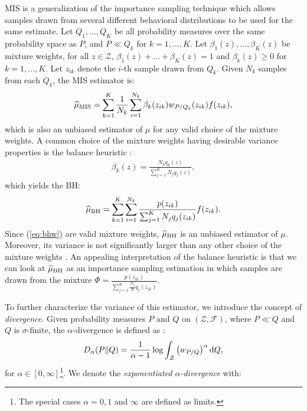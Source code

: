 \gls{MIS} \cite{veach_optimally_1995} is a generalization of the importance sampling technique which allows samples drawn from several different behavioral distributions to be used for the same estimate.
Let $Q_1,\dots,Q_K$ be all probability measures over the same probability space as $P$, and $P\ll Q_k$ for $k=1,\dots,K$. Let $\beta_1(z),\dots,\beta_K(z)$ be mixture weights, \ie for all $z\in\mathcal{Z}$, ${\beta_1(z)+\dots+\beta_K(z) = 1}$ and $\beta_k(z)\geq0$ for ${k=1,\dots,K}$. Let $z_{ik}$ denote the $i$-th sample drawn from $Q_k$. Given $N_k$ \iid samples from each $Q_k$, the \gls{MIS} estimator is:
\begin{align}\label{eq:mise}
	\widehat{\mu}_{\text{MIS}} = \sum_{k=1}^K\frac{1}{N_k}\sum_{i=1}^{N_k}\beta_k(z_{ik})w_{P/Q_k}(z_{ik})f(z_{ik}),
\end{align}
which is also an unbiased estimator of $\mu$ for any valid choice of the mixture weights. A common choice of the mixture weights having desirable variance properties is the balance heuristic \cite{veach_optimally_1995}: 
\begin{align}\label{eq:bhw}
	\beta_k(z) = \frac{N_kq_k(z)}{\sum_{j=1}^{K}N_jq_j(z)},
\end{align}
which yields the \gls{BH}:
\begin{align}\label{eq:bhe}
	\widehat{\mu}_{\text{BH}} = \sum_{k=1}^K\sum_{i=1}^{N_k}\frac{p(z_{ik})}{\sum_{j=1}^K N_jq_j(z_{ik})}f(z_{ik}).
\end{align}
Since (\ref{eq:bhw}) are valid mixture weights, $\widehat{\mu}_{\text{BH}}$ is an unbiased estimator of $\mu$. Moreover, its variance is not significantly larger than any other choice of the mixture weights \cite{veach_optimally_1995}. An appealing interpretation of the balance heuristic is that we can look at $\widehat{\mu}_{\text{BH}}$ as an importance sampling estimation in which samples are drawn from the mixture $\Phi = \frac{p(z_{ik})}{\sum_{j=1}^K \frac{N_j}{N}q_j(z_{ik})}$.

To further characterize the variance of this estimator, we introduce the concept of \emph{\Renyi divergence}. Given probability measures $P$ and $Q$ on $(\mathcal{Z},\mathcal{F})$, where $P\ll Q$ and $Q$ is $\sigma$-finite, the $\alpha$-\Renyi divergence is defined as \cite{renyi1961measures}:
\begin{align}\label{eq:renyi}
	D_{\alpha}(P\|Q) = \frac{1}{\alpha-1}\log\int_{\mathcal{Z}}\left(w_{P/Q}\right)^{\alpha}\mathrm{d} Q,
\end{align}
for $\alpha\in[0,\infty]$\footnote{The special cases $\alpha=0,1$ and $\infty$ are defined as limits.}.
We denote the \emph{exponentiated $\alpha$-\Renyi divergence} with:

